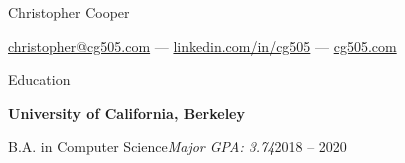 \usepackage[margin=.5in,letterpaper]{geometry}
\usepackage{libertine}
\usepackage{changepage}
\usepackage[hidelinks]{hyperref}
\usepackage{enumitem}
\usepackage[super]{nth}
\usepackage{hyphenat}


\renewcommand*\familydefault{\sfdefault}
\usepackage[T1]{fontenc}

\pagestyle{empty}

\setlength{\parindent}{0pt}
\setlength{\fboxsep}{-\fboxrule}

\newcommand{\link}[2]{\href{#1}{\underline{#2}}}


\begin{centering}
  \fontsize{42pt}{42pt}\selectfont
  \color{cg505green}
  Christopher Cooper

  \vspace{5pt}


\end{centering}

\vspace{10pt}



    \href{mailto:christopher@cg505.com}{christopher@cg505.com} ---
    \href{https://linkedin.com/in/cg505}{linkedin.com/in/cg505} ---
    \href{https://cg505.com/}{cg505.com}

  \vspace{10pt}

  {\sectionfont Education}

  \vspace{5pt}
  \textbf{University of California, Berkeley}%
  \vspace{2pt}
  \begin{adjustwidth}{10pt}{}
   B.A. in Computer Science\quad\emph{Major GPA: 3.74}\hfill{}2018 -- 2020


  \end{adjustwidth}

